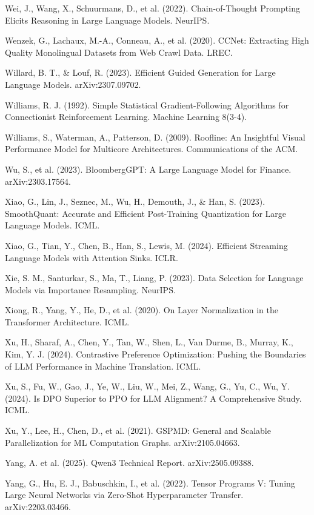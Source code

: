 {\begin{enumerate}[leftmargin=*,itemsep=1pt,label={[\arabic*]}]
\item Wei, J., Wang, X., Schuurmans, D., et al. (2022). Chain-of-Thought Prompting Elicits Reasoning in Large Language Models. NeurIPS.
\item Wenzek, G., Lachaux, M.-A., Conneau, A., et al. (2020). CCNet: Extracting High Quality Monolingual Datasets from Web Crawl Data. LREC.
\item Willard, B. T., \& Louf, R. (2023). Efficient Guided Generation for Large Language Models. arXiv:2307.09702.
\item Williams, R. J. (1992). Simple Statistical Gradient-Following Algorithms for Connectionist Reinforcement Learning. Machine Learning 8(3-4).
\item Williams, S., Waterman, A., Patterson, D. (2009). Roofline: An Insightful Visual Performance Model for Multicore Architectures. Communications of the ACM.
\item Wu, S., et al. (2023). BloombergGPT: A Large Language Model for Finance. arXiv:2303.17564.
\item Xiao, G., Lin, J., Seznec, M., Wu, H., Demouth, J., \& Han, S. (2023). SmoothQuant: Accurate and Efficient Post-Training Quantization for Large Language Models. ICML.
\item Xiao, G., Tian, Y., Chen, B., Han, S., Lewis, M. (2024). Efficient Streaming Language Models with Attention Sinks. ICLR.
\item Xie, S. M., Santurkar, S., Ma, T., Liang, P. (2023). Data Selection for Language Models via Importance Resampling. NeurIPS.
\item Xiong, R., Yang, Y., He, D., et al. (2020). On Layer Normalization in the Transformer Architecture. ICML.
\item Xu, H., Sharaf, A., Chen, Y., Tan, W., Shen, L., Van Durme, B., Murray, K., Kim, Y. J. (2024). Contrastive Preference Optimization: Pushing the Boundaries of LLM Performance in Machine Translation. ICML.
\item Xu, S., Fu, W., Gao, J., Ye, W., Liu, W., Mei, Z., Wang, G., Yu, C., Wu, Y. (2024). Is DPO Superior to PPO for LLM Alignment? A Comprehensive Study. ICML.
\item Xu, Y., Lee, H., Chen, D., et al. (2021). GSPMD: General and Scalable Parallelization for ML Computation Graphs. arXiv:2105.04663.
\item Yang, A. et al. (2025). Qwen3 Technical Report. arXiv:2505.09388.
\item Yang, G., Hu, E. J., Babuschkin, I., et al. (2022). Tensor Programs V: Tuning Large Neural Networks via Zero-Shot Hyperparameter Transfer. arXiv:2203.03466.

\end{enumerate}}

